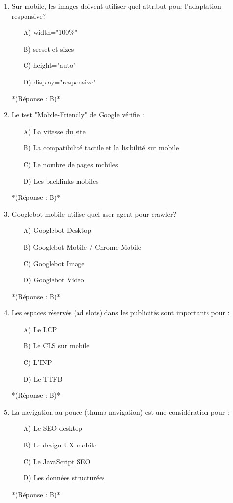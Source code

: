 \documentclass[12pt,a4paper,twoside]{report}
\begin{document}
\begin{enumerate}
\item Sur mobile, les images doivent utiliser quel attribut pour l'adaptation responsive?
\begin{itemize}
\item[A)] width="100\%"
\item[B)] srcset et sizes
\item[C)] height="auto"
\item[D)] display="responsive"
\end{itemize}
*(Réponse : B)*

\item Le test "Mobile-Friendly" de Google vérifie :
\begin{itemize}
\item[A)] La vitesse du site
\item[B)] La compatibilité tactile et la lisibilité sur mobile
\item[C)] Le nombre de pages mobiles
\item[D)] Les backlinks mobiles
\end{itemize}
*(Réponse : B)*

\item Googlebot mobile utilise quel user-agent pour crawler?
\begin{itemize}
\item[A)] Googlebot Desktop
\item[B)] Googlebot Mobile / Chrome Mobile
\item[C)] Googlebot Image
\item[D)] Googlebot Video
\end{itemize}
*(Réponse : B)*

\item Les espaces réservés (ad slots) dans les publicités sont importants pour :
\begin{itemize}
\item[A)] Le LCP
\item[B)] Le CLS sur mobile
\item[C)] L'INP
\item[D)] Le TTFB
\end{itemize}
*(Réponse : B)*

\item La navigation au pouce (thumb navigation) est une considération pour :
\begin{itemize}
\item[A)] Le SEO desktop
\item[B)] Le design UX mobile
\item[C)] Le JavaScript SEO
\item[D)] Les données structurées
\end{itemize}
*(Réponse : B)*


\end{enumerate}
\end{document}
